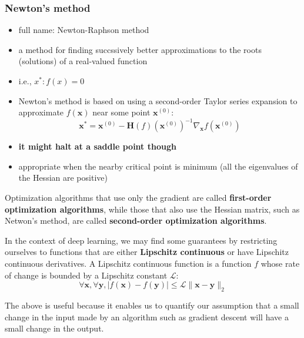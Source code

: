 \documentclass[11pt, twocolumn]{report}
\begin{document}
\subsubsection{Newton's method}
\begin{itemize}
  \item full name: Newton-Raphson method
  \item a method for finding succssively better approximations to the roots
    (solutions) of a real-valued function
  \item i.e., $x^* : f(x) = 0$
  \item Newton's method is based on using a second-order Taylor series
    expansion to approximate $f(\bm{x})$ near some point $\bm{x}^{(0)}$:
    \begin{equation}
      \bm{x}^* = \bm{x}^{(0)} -
      \bm{H}(f)(\bm{x}^{(0)})^{-1}\nabla_{\bm{x}}f(\bm{x}^{(0)})
    \end{equation}
  \item \textbf{it might halt at a saddle point though}
  \item appropriate when the nearby critical point is minimum (all the
    eigenvalues of the Hessian are positive)
\end{itemize}

Optimization algorithms that use only the gradient are called
\textbf{first-order optimization algorithms}, while those that also use the
Hessian matrix, such as Netwon's method, are called \textbf{second-order
  optimization algorithms}.

In the context of deep learning, we may find some guarantees by restricting
ourselves to functions that are either \textbf{Lipschitz continuous} or have
Lipschitz continuous derivatives. A Lipschitz continuous function is a function
$f$ whose rate of change is bounded by a Lipschitz constant $\mathcal{L}$:
\begin{equation}
  \forall \bm{x}, \forall \bm{y},
  | f(\bm{x}) - f(\bm{y}) | \leq \mathcal{L} \| \bm{x} - \bm{y} \|_2
\end{equation}

The above is useful because it enables us to quantify our assumption that a
small change in the input made by an algorithm such as gradient descent will
have a small change in the output.
\end{document}
